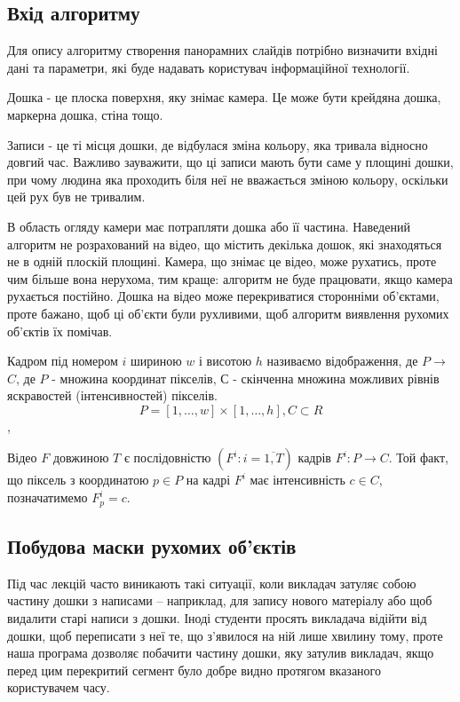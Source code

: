 \subsection{Вхід алгоритму}

Для опису алгоритму створення панорамних слайдів потрібно визначити 
вхідні дані та параметри, які буде надавать користувач інформаційної
технології.


Дошка - це плоска поверхня, яку знімає камера. Це може бути крейдяна 
дошка, маркерна дошка, стіна тощо.

Записи - це ті місця дошки, де відбулася зміна кольору, яка тривала 
відносно довгий час. Важливо зауважити, що ці записи мають бути 
саме у площині дошки, при чому людина яка проходить біля неї не вважається
зміною кольору, оскільки цей рух був не тривалим.

В область огляду камери має потрапляти дошка або її частина. Наведений 
алгоритм не розрахований на відео, що містить декілька дошок, які знаходяться
не в одній плоскій площині. Камера, що знімає це відео, може рухатись, проте 
чим більше вона нерухома, тим краще: алгоритм не буде працювати, якщо камера 
рухається постійно. Дошка на відео може перекриватися сторонніми об’єктами, 
проте бажано, щоб ці об’єкти були рухливими, щоб алгоритм виявлення рухомих 
об’єктів їх помічав.

Кадром під номером $i$ шириною $w$ і висотою $h$ називаємо відображення, де 
$P$$\to$$C$, де $P$ - множина координат пікселів, $С$ - скінченна множина можливих рівнів
яскравостей (інтенсивностей) пікселів.
\begin{equation}
    P = [1, \ldots ,w]\times[1, \ldots, h], C \subset R
\end{equation},

Відео \(F\) довжиною \(T\)
є послідовністю \(\left( F^{i}:i = \overline{1,T} \right)\) кадрів
\(F^{i}:P \rightarrow C\). Той факт, що піксель з координатою
\(p \in P\) на кадрі \(F^{i}\) має інтенсивність \(c \in C\),
позначатимемо \(F_{p}^{i} = c\).


\subsection{Побудова маски рухомих об'єктів}

Під час лекцій часто виникають такі ситуації, коли викладач затуляє
собою частину дошки з написами -- наприклад, для запису нового матеріалу
або щоб видалити старі написи з дошки. Іноді студенти просять викладача
відійти від дошки, щоб переписати з неї те, що з'явилося на ній лише
хвилину тому, проте наша програма дозволяє побачити частину дошки, яку
затулив викладач, якщо перед цим перекритий сегмент було добре видно
протягом вказаного користувачем часу.

